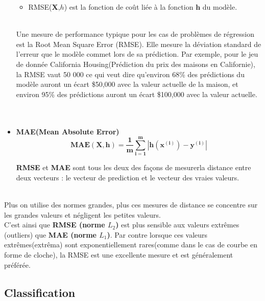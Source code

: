 \documentclass[french]{article}
\begin{document}
\begin{itemize}[label=\textbullet, font=\LARGE \color{red}]
\begin{itemize}[label=\textbullet]
			\item RMSE(\textbf{X},$h$) est la fonction de coût liée à la fonction $\bm{h}$ du modèle.\\\\
	\end{itemize}	
		Une mesure de performance typique pour les cas de problèmes de régression est la Root Mean Square Error (RMSE). Elle mesure la déviation standard de l'erreur que le modèle commet lors de sa prédiction. Par exemple, pour le jeu de donnée California Housing(Prédiction du prix des maisons en Californie), la RMSE vaut 50 000 ce qui veut dire qu'environ 68\% des prédictions du modèle auront un écart \$50,000 avec la valeur actuelle de la maison, et environ 95\% des prédictions auront un écart \$100,000 avec la valeur actuelle.\\\\\\
		
		\item \textbf{MAE(Mean Absolute Error)}
		$$\bm{MAE(X,h)=\frac{1}{m}\sum_{i=1}^{m}|h(x^{(i)})-y^{(i)}|}$$
		
		\textbf{RMSE} et \textbf{MAE} sont tous les deux des façons de mesurerla distance entre deux vecteurs : le vecteur de prediction et le vecteur des vraies valeurs. \\\\
		\end{itemize}
		Plus on utilise des normes grandes, plus ces mesures de distance se concentre sur les grandes valeurs et négligent les petites valeurs. \\C'est ainsi que \textbf{RMSE (norme $L_{2}$)} est plus sensible aux valeurs extrêmes (outliers) que \textbf{MAE (norme $L_{1}$)}. Par contre lorsque ces valeurs extrêmes(extrêma) sont exponentiellement rares(comme dans le cas de courbe en forme de cloche), la RMSE est une excellente mesure et est généralement préférée.
		
	\subsection{Classification}
	
\end{document}
